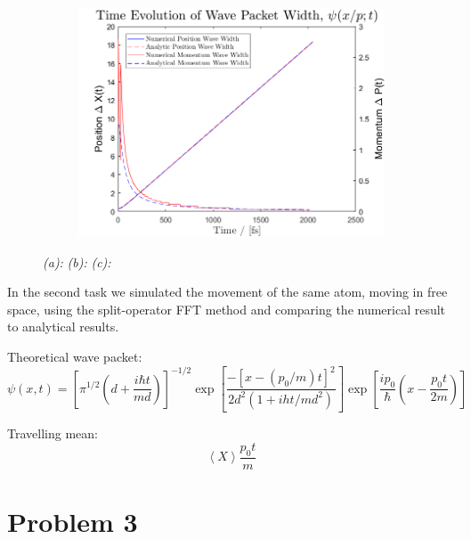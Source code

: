 \begin{figure}[H]
\begin{subfigure}[t]{0.7\textwidth}
\includegraphics[width=\textwidth]{graphics/Task2/width_evolution.png}
\caption{}
\label{fig:2_c}
\end{subfigure}

\caption{
	\textit{(a):}  
	\textit{(b):} 
	\textit{(c):} 
}
\label{fig:2}
\end{figure}

In the second task we simulated the movement of the same atom, moving in free space, using the split-operator FFT method and comparing the numerical result to analytical results.

Theoretical wave packet:
\begin{equation}
\psi(x,t) = \left[
\pi^{1/2}\left(
d+\frac{i\hbar t}{md}
\right)
\right]^{-1/2}
\exp\left[
\frac{-\left[x-\left(p_0/m\right)t\right]^2}{2d^2(1+iht/md^2)}
\right]
\exp\left[
\frac{ip_0}{\hbar}\left(x-\frac{p_0t}{2m}\right)
\right]
\end{equation}

Travelling mean:
\begin{equation}
\left<X\right>\frac{p_0t}{m}
\end{equation}



\section*{Problem 3}

